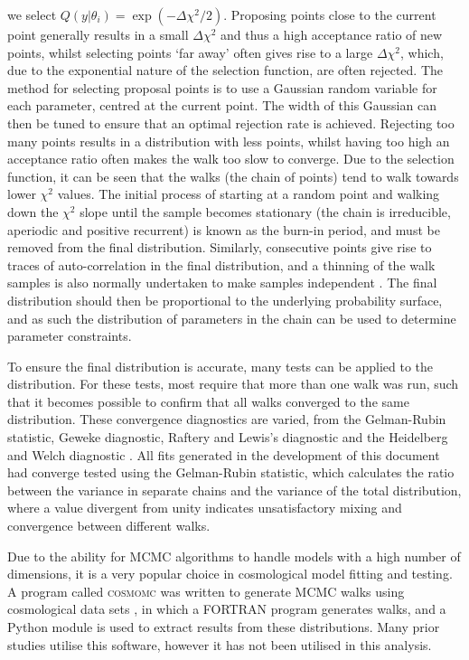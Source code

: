 \documentclass[titlesmallcaps, examinerscopy, copyrightpage]{uqthesis}
\begin{document}
we select $Q(y|\theta_i) = \exp(-\Delta \chi^2 / 2)$. Proposing points close to the current point generally results in a small $\Delta \chi^2$ and thus a high acceptance ratio of new points, whilst selecting points `far away' often gives rise to a large $\Delta \chi^2$, which, due to the exponential nature of the selection function, are often rejected. The method for selecting proposal points is to use a Gaussian random variable for each parameter, centred at the current point. The width of this Gaussian can then be tuned to ensure that an optimal rejection rate is achieved. Rejecting too many points results in a distribution with less points, whilst having too high an acceptance ratio often makes the walk too slow to converge. Due to the selection function, it can be seen that the walks (the chain of points) tend to walk towards lower $\chi^2$ values. The initial process of starting at a random point and walking down the $\chi^2$ slope until the sample becomes stationary (the chain is irreducible, aperiodic and positive recurrent) is known as the burn-in period, and must be removed from the final distribution. Similarly, consecutive points give rise to traces of auto-correlation in the final distribution, and a thinning of the walk samples is also normally undertaken to make samples independent \citep{Gilks1995markov}. The final distribution should then be proportional to the underlying probability surface, and as such the distribution of parameters in the chain can be used to determine parameter constraints.

To ensure the final distribution is accurate, many tests can be applied to the distribution. For these tests, most require that more than one walk was run, such that it becomes possible to confirm that all walks converged to the same distribution. These convergence diagnostics are varied, from the Gelman-Rubin statistic, Geweke diagnostic, Raftery and Lewis's diagnostic and the Heidelberg and Welch diagnostic \citep{CowlesCarlin1996,Gilks1995markov}. All fits generated in the development of this document had converge tested using the Gelman-Rubin statistic, which calculates the ratio between the variance in separate chains and the variance of the total distribution, where a value divergent from unity indicates unsatisfactory mixing and convergence between different walks.

Due to the ability for MCMC algorithms to handle models with a high number of dimensions, it is a very popular choice in cosmological model fitting and testing. A program called \textsc{cosmomc} was written to generate MCMC walks using cosmological data sets \citep{LewisBridle2002}, in which a FORTRAN program generates walks, and a Python module is used to extract results from these distributions. Many prior studies utilise this software, however it has not been utilised in this analysis.
\end{document}
